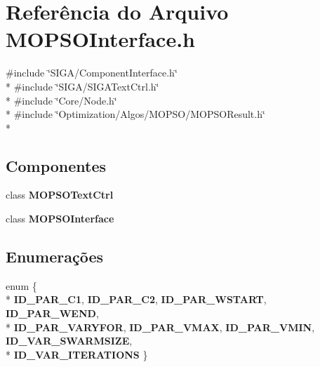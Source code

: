\section{Referência do Arquivo M\+O\+P\+S\+O\+Interface.\+h}
\label{_m_o_p_s_o_interface_8h}
{\ttfamily \#include \char`\"{}S\+I\+G\+A/\+Component\+Interface.\+h\char`\"{}}\\*
{\ttfamily \#include \char`\"{}S\+I\+G\+A/\+S\+I\+G\+A\+Text\+Ctrl.\+h\char`\"{}}\\*
{\ttfamily \#include \char`\"{}Core/\+Node.\+h\char`\"{}}\\*
{\ttfamily \#include \char`\"{}Optimization/\+Algos/\+M\+O\+P\+S\+O/\+M\+O\+P\+S\+O\+Result.\+h\char`\"{}}\\*
\subsection*{Componentes}
\begin{DoxyCompactItemize}
\item 
class {\bf M\+O\+P\+S\+O\+Text\+Ctrl}
\item 
class {\bf M\+O\+P\+S\+O\+Interface}
\end{DoxyCompactItemize}
\subsection*{Enumerações}
\begin{DoxyCompactItemize}
\item 
enum \{ \\*
{\bf I\+D\+\_\+\+P\+A\+R\+\_\+\+C1}, 
{\bf I\+D\+\_\+\+P\+A\+R\+\_\+\+C2}, 
{\bf I\+D\+\_\+\+P\+A\+R\+\_\+\+W\+S\+T\+A\+RT}, 
{\bf I\+D\+\_\+\+P\+A\+R\+\_\+\+W\+E\+ND}, 
\\*
{\bf I\+D\+\_\+\+P\+A\+R\+\_\+\+V\+A\+R\+Y\+F\+OR}, 
{\bf I\+D\+\_\+\+P\+A\+R\+\_\+\+V\+M\+AX}, 
{\bf I\+D\+\_\+\+P\+A\+R\+\_\+\+V\+M\+IN}, 
{\bf I\+D\+\_\+\+V\+A\+R\+\_\+\+S\+W\+A\+R\+M\+S\+I\+ZE}, 
\\*
{\bf I\+D\+\_\+\+V\+A\+R\+\_\+\+I\+T\+E\+R\+A\+T\+I\+O\+NS}
 \}
\end{DoxyCompactItemize}
